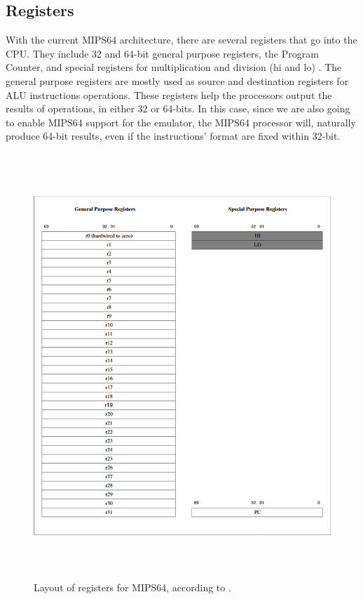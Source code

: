\documentclass[
    paper=letter,
    parskip=half,
    fontsize=12pt,
    titlepage=firstiscover,
    toc=bibliography,
    numbers=endperiod
]{scrartcl}
\begin{document}
\subsection{Registers}
\label{subsec:mips64-registers}

With the current MIPS64 architecture, there are several registers that
go into the CPU. They include 32 and 64-bit general purpose registers,
the Program Counter, and special registers for multiplication and
division (hi and lo) \cite{mips-specification}. The general purpose registers are mostly used as
source and destination registers for ALU instructions operations. These
registers help the processors output the results of operations, in
either 32 or 64-bits. In this case, since we are also going to enable
MIPS64 support for the emulator, the MIPS64 processor will, naturally
produce 64-bit results, even if the instructions' format are fixed within
32-bit.

\begin{figure}[H]
    \includegraphics[height=16cm]{mips64-register-layout}
    \caption{Layout of registers for MIPS64, according to \protect\cite{mips-specification}.}
\end{figure}
\end{document}
